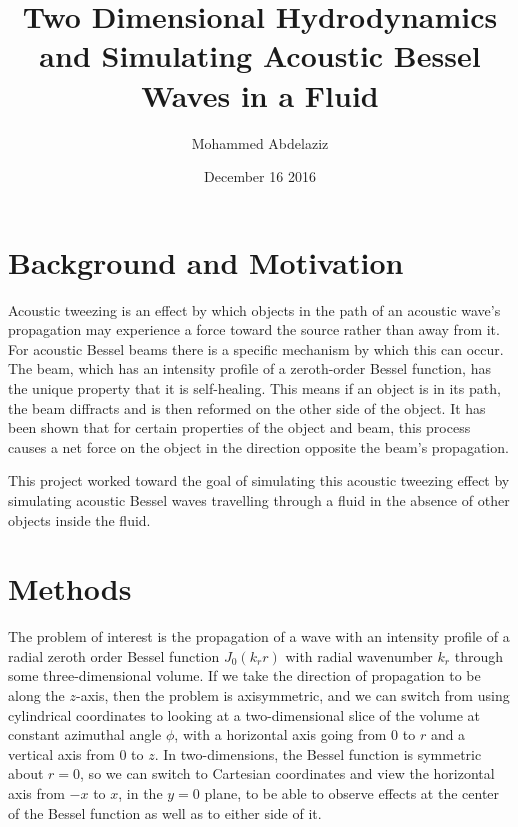 \documentclass{article}
\title{Two Dimensional Hydrodynamics and Simulating Acoustic Bessel Waves in a Fluid}
\author{Mohammed Abdelaziz}
\date{December 16 2016}
\begin{document}
\maketitle
\section{Background and Motivation}

Acoustic tweezing is an effect by which objects in the path of an acoustic wave's propagation may experience a force toward the source rather than away from it. For acoustic Bessel beams there is a specific mechanism by which this can occur. The beam, which has an intensity profile of a zeroth-order Bessel function, has the unique property that it is self-healing. This means if an object is in its path, the beam diffracts and is then reformed on the other side of the object. It has been shown that for certain properties of the object and beam, this process causes a net force on the object in the direction opposite the beam's propagation.

This project worked toward the goal of simulating this acoustic tweezing effect by simulating acoustic Bessel waves travelling through a fluid in the absence of other objects inside the fluid.  
\section{Methods}
The problem of interest is the propagation of a wave with an intensity profile of a radial zeroth order Bessel function $J_0(k_r r)$ with radial wavenumber $k_r$ through some three-dimensional volume. If we take the direction of propagation to be along the $z$-axis, then the problem is axisymmetric, and we can switch from using cylindrical coordinates to looking at a two-dimensional slice of the volume at constant azimuthal angle $\phi$, with a horizontal axis going from $0$ to $r$ and a vertical axis from $0$ to $z$. In two-dimensions, the Bessel function is symmetric about $r=0$, so we can switch to Cartesian coordinates and view the horizontal axis from $-x$ to $x$, in the $y=0$ plane, to be able to observe effects at the center of the Bessel function as well as to either side of it.
\end{document}
